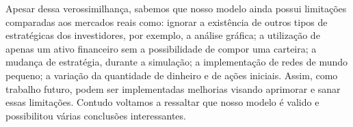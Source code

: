 \documentclass[brazil,ruledheader]{abnt}
\begin{document}
Apesar dessa verossimilhança, sabemos que nosso modelo ainda possui limitações
comparadas aos mercados reais como: ignorar a existência de outros tipos de
estratégicas dos investidores, por exemplo, a análise gráfica; a utilização de
apenas um ativo financeiro sem a possibilidade de compor uma carteira; a mudança
de estratégia, durante a simulação; a implementação de redes de mundo pequeno; a
variação da quantidade de dinheiro e de ações iniciais. Assim, como trabalho
futuro, podem ser implementadas melhorias visando aprimorar e sanar essas
limitações. Contudo voltamos a ressaltar que nosso modelo é valido e
possibilitou várias conclusões interessantes.   




%
\end{document}
